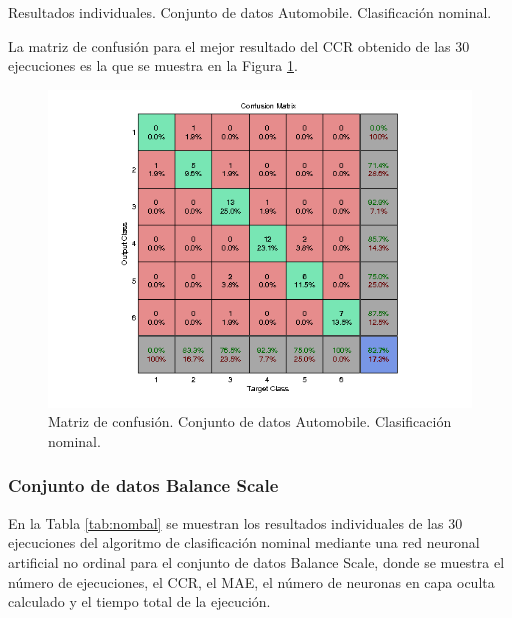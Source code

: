 			\begin{table}[!htbp]
				\centering
				\caption{Resultados individuales. Conjunto de datos Automobile. Clasificación nominal.}
				\label{tab:nomaut}
			\end{table}
			
			La matriz de confusión para el mejor resultado del CCR obtenido de las 30 ejecuciones es la que se muestra en la Figura \ref{fig:nomaut}.
			
			\begin{figure}[htbp]
				\centering
				\includegraphics[scale=0.8]{../src/results/nominal/automobile_mc29.png}
				\caption{Matriz de confusión. Conjunto de datos Automobile. Clasificación nominal.}
				\label{fig:nomaut}
			\end{figure}
			
			\subsubsection{Conjunto de datos Balance Scale}
			
			En la Tabla \ref{tab:nombal} se muestran los resultados individuales de las 30 ejecuciones del algoritmo de clasificación nominal mediante una red neuronal artificial no ordinal para el conjunto de datos Balance Scale, donde se muestra el número de ejecuciones, el CCR, el MAE, el número de neuronas en capa oculta calculado y el tiempo total de la ejecución.\\
			

